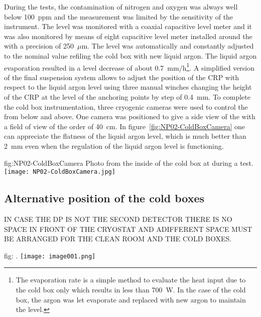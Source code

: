 During the tests, the contamination of nitrogen and oxygen was always well below 100~ppm and the measurement was limited by the sensitivity of the instrument.
The level was monitored with a coaxial capacitive level meter and it was also monitored by means of eight capacitive level meter installed around the  with a precision of 250~$\mu$m.
The level was automatically and constantly adjusted to the nominal value refiling the cold box with new liquid argon.
The liquid argon evaporation resulted in a level decrease of about 0.7~mm/h\footnote{The evaporation rate is a simple method to evaluate the heat input due to the cold box only which results in less than 700~W. In the case of the  cold box, the argon was let evaporate and replaced with new argon to maintain the level.}.
A simplified version of the  final suspension system allows to adjust the position of the CRP with respect to the liquid argon level using three manual winches changing the height of the CRP at the level of the anchoring points by step of 0.4~mm.
To complete the cold box instrumentation, three cryogenic cameras were used to control the  from below and above.
One camera was positioned to give a side view of the  with a field of view of the order of 40~cm.
In figure~\ref{fig:NP02-ColdBoxCamera} one can appreciate the flatness of the liquid argon level, which is much better than 2~mm even when the regulation of the liquid argon level is functioning.
\begin{dunefigure}{fig:NP02-ColdBoxCamera}
{Photo from the inside of the  cold box at  during a  test.}
\texttt{[image: NP02-ColdBoxCamera.jpg]}
\end{dunefigure}

\subsection{Alternative position of the cold boxes}
IN CASE THE DP IS NOT THE SECOND DETECTOR THERE IS NO SPACE IN FRONT OF THE CRYOSTAT AND ADIFFERENT SPACE MUST BE ARRANGED FOR THE CLEAN ROOM AND THE COLD BOXES.
\begin{dunefigure}[]{fig:}
{.}
\texttt{[image: image001.png]}
\end{dunefigure}
